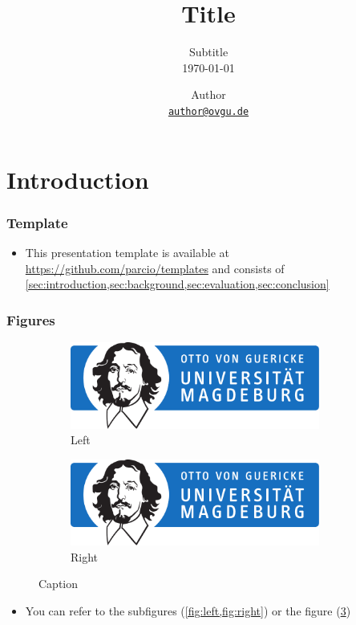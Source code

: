 \documentclass[
	aspectratio=169,
	compress,
]{beamer}
\title{Title}
\subtitle{
Subtitle\\
{\small\today}
}
\date{}
\author[Author]{
Author\\
{\footnotesize\href{mailto:author@ovgu.de}{\nolinkurl{author@ovgu.de}}}
}
\institute{
Faculty of Computer Science\\
Otto von Guericke University Magdeburg
}
\newcommand{\navframetitle}[1]{\frametitle{#1\hfill{\footnotesize\lastsection{}}}}
\begin{document}
\maketitle

\section{Introduction}
\label{sec:introduction}

\begin{frame}
	\navframetitle{Template}

	\begin{itemize}
		\item This presentation template is available at \url{https://github.com/parcio/templates} and consists of \cref{sec:introduction,sec:background,sec:evaluation,sec:conclusion}
	\end{itemize}
\end{frame}

\begin{frame}
	\navframetitle{Figures}

	\begin{figure}[ht]
		\centering
		\begin{subfigure}{0.45\textwidth}
			\centering
			\includegraphics[width=0.9\textwidth]{OVGU-INF}
			\caption{Left}
			\label{fig:left}
		\end{subfigure}
		\begin{subfigure}{0.45\textwidth}
			\centering
			\includegraphics[width=0.9\textwidth]{OVGU-INF}
			\caption{Right}
			\label{fig:right}
		\end{subfigure}
		\caption{Caption}
		\label{fig:both}
	\end{figure}

	\begin{itemize}
		\item You can refer to the subfigures (\cref{fig:left,fig:right}) or the figure (\cref{fig:both})
	\end{itemize}
\end{frame}
\end{document}
